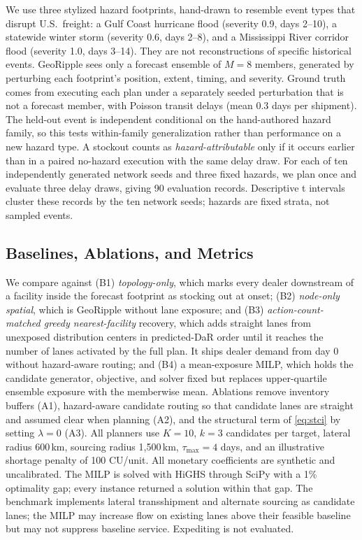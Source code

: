 \documentclass[conference]{IEEEtran}
\begin{document}
We use three stylized hazard footprints, hand-drawn to resemble event
types that disrupt U.S.\ freight: a Gulf Coast hurricane flood (severity
0.9, days 2--10), a statewide winter storm (severity 0.6, days 2--8), and
a Mississippi River corridor flood (severity 1.0, days 3--14). They are
not reconstructions of specific historical events. GeoRipple sees only a
forecast ensemble of $M=8$ members, generated by perturbing each
footprint's position, extent, timing, and severity. Ground truth comes
from executing each plan under a separately seeded perturbation that is not a
forecast member, with Poisson transit delays (mean 0.3 days per shipment).
The held-out event is independent conditional on the hand-authored hazard
family, so this tests within-family generalization rather than performance on
a new hazard type. A stockout counts as
\emph{hazard-attributable} only if it occurs earlier than in a paired
no-hazard execution with the same delay draw. For each of ten
independently generated network seeds and three fixed hazards, we plan
once and evaluate three delay draws, giving 90 evaluation records.
Descriptive t intervals cluster these records by the ten network seeds;
hazards are fixed strata, not sampled events.

\subsection{Baselines, Ablations, and Metrics}
We compare against (B1) \emph{topology-only}, which marks every dealer
downstream of a facility inside the forecast footprint as stocking out at
onset; (B2) \emph{node-only spatial}, which is GeoRipple without lane
exposure; and (B3) \emph{action-count-matched greedy nearest-facility}
recovery, which adds straight lanes from unexposed distribution centers
in predicted-DaR order until it reaches the number of lanes activated by
the full plan. It ships dealer demand from day 0 without hazard-aware
routing; and (B4) a mean-exposure MILP, which holds the candidate generator,
objective, and solver fixed but replaces upper-quartile ensemble exposure
with the memberwise mean. Ablations remove inventory buffers
(A1), hazard-aware candidate routing so that candidate lanes are
straight and assumed clear when planning (A2), and the structural term
of \eqref{eq:stci} by setting $\lambda=0$ (A3). All planners use $K=10$,
$k=3$ candidates per target, lateral radius 600\,km, sourcing radius
1{,}500\,km, $\tau_{\max}=4$ days, and an illustrative shortage penalty
of 100 CU/unit. All monetary coefficients are synthetic and uncalibrated.
The MILP is solved with HiGHS through SciPy with a 1\% optimality gap;
every instance returned a solution within that gap. The benchmark implements lateral transshipment
and alternate sourcing as candidate lanes; the MILP may increase flow on
existing lanes above their feasible baseline but may not suppress baseline
service. Expediting is not evaluated.
\end{document}

